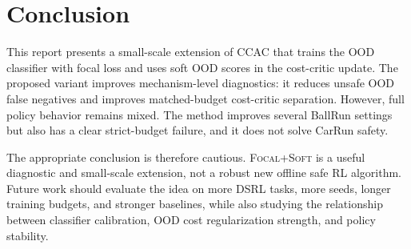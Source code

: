 \documentclass[11pt,a4paper]{article}
\newcommand{\ccac}{\textsc{CCAC}}
\newcommand{\ours}{\textsc{Focal+Soft}}
\begin{document}
\section{Conclusion}

This report presents a small-scale extension of \ccac{} that trains the OOD
classifier with focal loss and uses soft OOD scores in the cost-critic update.
The proposed variant improves mechanism-level diagnostics: it reduces unsafe
OOD false negatives and improves matched-budget cost-critic separation.
However, full policy behavior remains mixed. The method improves several
BallRun settings but also has a clear strict-budget failure, and it does not
solve CarRun safety.

The appropriate conclusion is therefore cautious. \ours{} is a useful
diagnostic and small-scale extension, not a robust new offline safe RL
algorithm. Future work should evaluate the idea on more DSRL tasks, more seeds,
longer training budgets, and stronger baselines, while also studying the
relationship between classifier calibration, OOD cost regularization strength,
and policy stability.



\end{document}
